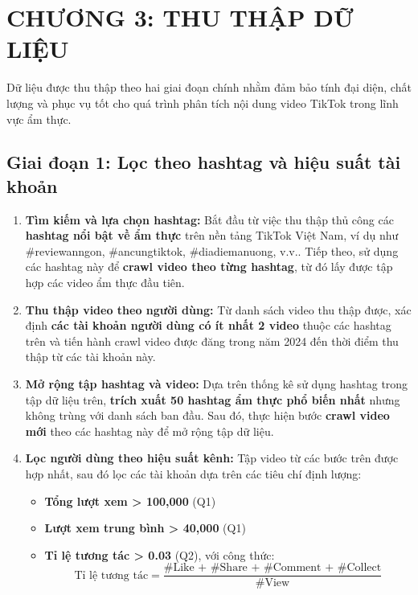 \section{CHƯƠNG 3: THU THẬP DỮ LIỆU}

Dữ liệu được thu thập theo hai giai đoạn chính nhằm đảm bảo tính đại diện, chất lượng và phục vụ tốt cho quá trình phân tích nội dung video TikTok trong lĩnh vực ẩm thực.

\subsection*{Giai đoạn 1: Lọc theo hashtag và hiệu suất tài khoản}

\begin{enumerate}
  \item \textbf{Tìm kiếm và lựa chọn hashtag:} Bắt đầu từ việc thu thập thủ công các \textbf{hashtag nổi bật về ẩm thực} trên nền tảng TikTok Việt Nam, ví dụ như \#reviewanngon, \#ancungtiktok, \#diadiemanuong, v.v.. Tiếp theo, sử dụng các hashtag này để \textbf{crawl video theo từng hashtag}, từ đó lấy được tập hợp các video ẩm thực đầu tiên.

  \item \textbf{Thu thập video theo người dùng:} Từ danh sách video thu thập được, xác định \textbf{các tài khoản người dùng có ít nhất 2 video} thuộc các hashtag trên và tiến hành crawl video được đăng trong năm 2024 đến thời điểm thu thập từ các tài khoản này.
  
  \item \textbf{Mở rộng tập hashtag và video:} Dựa trên thống kê sử dụng hashtag trong tập dữ liệu trên, \textbf{trích xuất 50 hashtag ẩm thực phổ biến nhất} nhưng không trùng với danh sách ban đầu. Sau đó, thực hiện bước \textbf{crawl video mới} theo các hashtag này để mở rộng tập dữ liệu.

  \item \textbf{Lọc người dùng theo hiệu suất kênh:} Tập video từ các bước trên được hợp nhất, sau đó lọc các tài khoản dựa trên các tiêu chí định lượng:
    \begin{itemize}
      \item \textbf{Tổng lượt xem > 100,000} (Q1)
      \item \textbf{Lượt xem trung bình > 40,000} (Q1)
      \item \textbf{Tỉ lệ tương tác > 0.03} (Q2), với công thức:
      \[
      \text{Tỉ lệ tương tác} = \frac{\text{\#Like + \#Share + \#Comment + \#Collect}}{\text{\#View}}
      \]
      \label{sec:engagement}
    \end{itemize}
\end{enumerate}

